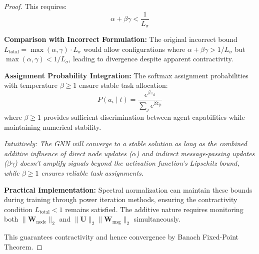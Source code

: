 \documentclass{article}
\begin{document}
\begin{proof}
This requires:
\begin{equation}
\alpha + \beta\gamma < \frac{1}{L_\sigma}
\end{equation}

\textbf{Comparison with Incorrect Formulation:} The original incorrect bound $L_{\text{total}} = \max(\alpha, \gamma) \cdot L_\sigma$ would allow configurations where $\alpha + \beta\gamma > 1/L_\sigma$ but $\max(\alpha, \gamma) < 1/L_\sigma$, leading to divergence despite apparent contractivity.

\textbf{Assignment Probability Integration:} The softmax assignment probabilities with temperature $\beta \geq 1$ ensure stable task allocation:
\begin{equation}
P(a_i \mid t) = \frac{e^{\beta z_{it}}}{\sum_j e^{\beta z_{jt}}}
\end{equation}
where $\beta \geq 1$ provides sufficient discrimination between agent capabilities while maintaining numerical stability.

\textit{Intuitively: The GNN will converge to a stable solution as long as the combined additive influence of direct node updates ($\alpha$) and indirect message-passing updates ($\beta\gamma$) doesn't amplify signals beyond the activation function's Lipschitz bound, while $\beta \geq 1$ ensures reliable task assignments.}

\textbf{Practical Implementation:} Spectral normalization can maintain these bounds during training through power iteration methods, ensuring the contractivity condition $L_{\text{total}} < 1$ remains satisfied. The additive nature requires monitoring both $\|\mathbf{W}_{\text{node}}\|_2$ and $\|\mathbf{U}\|_2 \|\mathbf{W}_{\text{msg}}\|_2$ simultaneously.

This guarantees contractivity and hence convergence by Banach Fixed-Point Theorem.
\end{proof}

\end{document}
